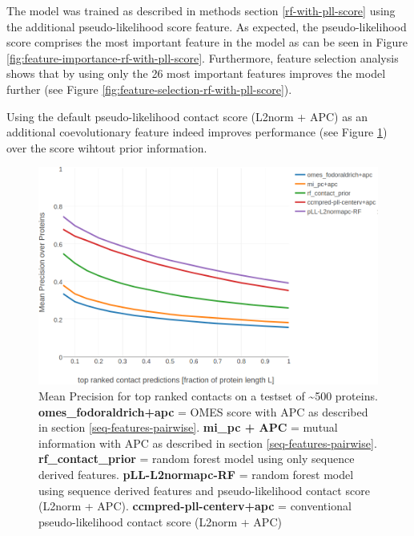 \documentclass[12pt,a4paper,twoside]{book}
\theoremstyle{definition}
\theoremstyle{definition}
\theoremstyle{remark}
\begin{document}
The model was trained as described in methods section
\ref{rf-with-pll-score} using the additional pseudo-likelihood score
feature. As expected, the pseudo-likelihood score comprises the most
important feature in the model as can be seen in Figure
\ref{fig:feature-importance-rf-with-pll-score}. Furthermore, feature
selection analysis shows that by using only the 26 most important
features improves the model further (see Figure
\ref{fig:feature-selection-rf-with-pll-score}).

Using the default pseudo-likelihood contact score (L2norm + APC) as an
additional coevolutionary feature indeed improves performance (see
Figure \ref{fig:performance-rf-with-pll-score}) over the score wihtout
prior information.













\begin{figure}
\includegraphics[width=1\linewidth]{img/random_forest_contact_prior/precision_vs_rank_notitle} \caption{Mean Precision for top
ranked contacts on a testset of \textasciitilde{}500 proteins.
\textbf{omes\_fodoraldrich+apc} = OMES score with APC as described in
section \ref{seq-features-pairwise}. \textbf{mi\_pc + APC} = mutual
information with APC as described in section
\ref{seq-features-pairwise}. \textbf{rf\_contact\_prior} = random forest
model using only sequence derived features. \textbf{pLL-L2normapc-RF} =
random forest model using sequence derived features and
pseudo-likelihood contact score (L2norm + APC).
\textbf{ccmpred-pll-centerv+apc} = conventional pseudo-likelihood
contact score (L2norm + APC)}\label{fig:performance-rf-with-pll-score}
\end{figure}
\end{document}
